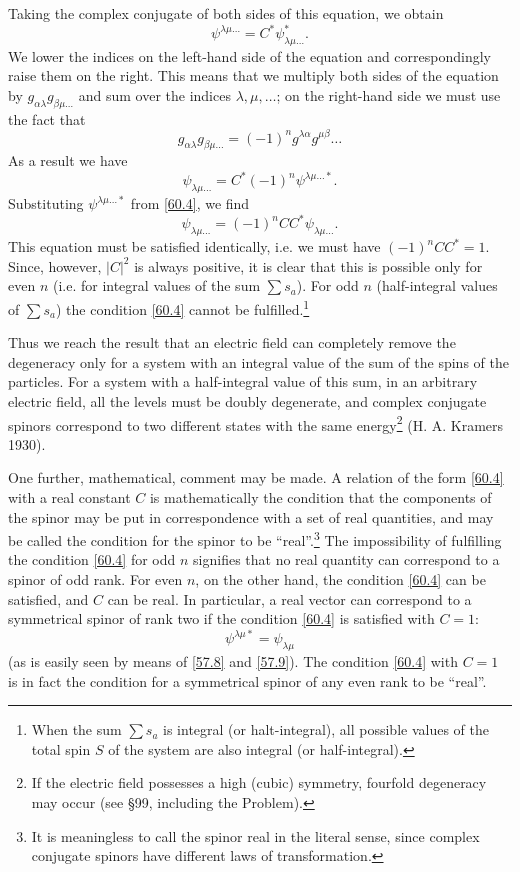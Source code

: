 Taking the complex conjugate of both sides of this equation, we obtain
\[ \psi^{\lambda\mu\dots}=C^*\psi^*_{\lambda\mu\dots} .\]
We lower the indices on the left-hand side of the equation and correspondingly raise them on the right. This means that we multiply both sides of the equation by $ g_{\alpha\lambda}g_{\beta\mu\dots} $ and sum over the indices $ \lambda,\mu,\dots $; on the right-hand side we must use the fact that
\[ g_{\alpha\lambda}g_{\beta\mu\dots}=(-1)^ng^{\lambda\alpha}g^{\mu\beta}\dots \]
As a result we have
\[ \psi_{\lambda\mu\dots}=C^*(-1)^n\psi^{\lambda\mu\dots*}. \]
Substituting $ \psi^{\lambda\mu\dots*} $ from \eqref{60.4}, we find
\[ \psi_{\lambda\mu\dots}=(-1)^nCC^*\psi_{\lambda\mu\dots}. \]
This equation must be satisfied identically, i.e. we must have $ (-1)^nCC^* = 1 $. Since, however, $ |C|^2 $ is always positive, it is clear that this is possible only for even $ n $ (i.e. for integral values of the sum $ \sum s_a $). For odd $ n $ (half-integral values of $ \sum s_a $) the condition \eqref{60.4} cannot be fulfilled.\footnote{When the sum $ \sum s_a $ is integral (or halt-integral), all possible values of the total spin $ S $ of the system are also integral (or half-integral).
}

Thus we reach the result that an electric field can completely remove the degeneracy only for a system with an integral value of the sum of the spins of the particles. For a system with a half-integral value of this sum, in an arbitrary electric field, all the levels must be doubly degenerate, and complex conjugate spinors correspond to two different states with the same energy\footnote{If the electric field possesses a high (cubic) symmetry, fourfold degeneracy may occur (see \S99, including the Problem).
} (H. A. Kramers 1930).

One further, mathematical, comment may be made. A relation of the form \eqref{60.4} with a real constant $ C $ is mathematically the condition that the components of the spinor may be put in correspondence with a set of real quantities, and may be called the condition for the spinor to be “real”.\footnote{It is meaningless to call the spinor real in the literal sense, since complex conjugate spinors have different laws of transformation.
} The impossibility of fulfilling the condition \eqref{60.4} for odd $ n $ signifies that no real quantity can correspond to a spinor of odd rank. For even $ n $, on the other hand, the condition \eqref{60.4} can be satisfied, and $ C $ can be real. In particular, a real vector can correspond to a symmetrical spinor of rank two if the condition \eqref{60.4} is satisfied with $ C = 1 $:
\[\psi^{\lambda\mu*}=\psi_{\lambda\mu}  \]
(as is easily seen by means of \eqref{57.8} and \eqref{57.9}). The condition \eqref{60.4} with $ C = 1 $ is in fact the condition for a symmetrical spinor of any even rank to be “real”.
